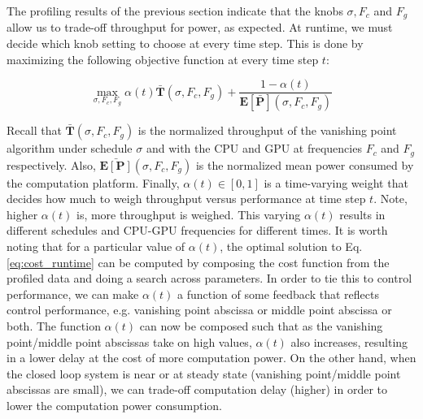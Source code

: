 
The profiling results of the previous section indicate that the knobs $\sigma, F_c$ and $F_g$ allow us to trade-off throughput for power, as expected.
At runtime, we must decide which knob setting to choose at every time step. 
This is done by maximizing the following objective function at every time step $t$:

\begin{equation}
\max_{\sigma,F_{c},F_{g}} \alpha(t)\mathbf{\bar{T}}(\sigma,F_{c},F_{g}) + \frac{1-\alpha(t)}{\mathbf{E[\bar{P}]}(\sigma,F_{c},F_{g})}
\label{eq:cost_runtime}
\end{equation}

Recall that $\mathbf{\bar{T}}(\sigma,F_{c},F_{g})$ is the normalized throughput of the vanishing point algorithm under schedule $\sigma$ and with the CPU and GPU at frequencies $F_c$ and $F_g$ respectively. 
Also, $\mathbf{\bar{E[P]}}(\sigma,F_{c},F_{g})$ is the normalized mean power consumed by the computation platform.
Finally, $\alpha(t) \in [0,1]$ is a time-varying weight that decides how much to weigh throughput versus performance at time step $t$. 
Note, higher $\alpha(t)$ is, more throughput is weighed. 
This varying $\alpha(t)$ results in different schedules and CPU-GPU frequencies for different times. It is worth noting that for a particular value of $\alpha(t)$, the optimal solution to Eq. \ref{eq:cost_runtime} can be computed by composing the cost function from the profiled data and doing a search across parameters. In order to tie this to control performance, we can make $\alpha(t)$ a function of some feedback that reflects control performance, e.g. vanishing point abscissa or middle point abscissa or both. The function $\alpha(t)$ can now be composed such that as the vanishing point/middle point abscissas take on high values, $\alpha(t)$ also increases, resulting in a lower delay at the cost of more computation power. On the other hand, when the closed loop system is near or at steady state (vanishing point/middle point abscissas are small), we can trade-off computation delay (higher) in order to lower the computation power consumption. 